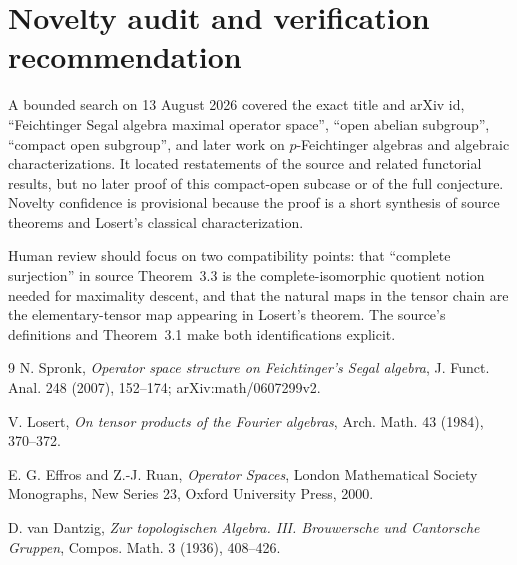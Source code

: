 \documentclass[11pt]{article}
\begin{document}
\section{Novelty audit and verification recommendation}

A bounded search on 13 August 2026 covered the exact title and arXiv id,
``Feichtinger Segal algebra maximal operator space'', ``open abelian
subgroup'', ``compact open subgroup'', and later work on $p$-Feichtinger
algebras and algebraic characterizations.  It located restatements of the
source and related functorial results, but no later proof of this compact-open
subcase or of the full conjecture.  Novelty confidence is provisional because
the proof is a short synthesis of source theorems and Losert's classical
characterization.

Human review should focus on two compatibility points: that ``complete
surjection'' in source Theorem~3.3 is the complete-isomorphic quotient notion
needed for maximality descent, and that the natural maps in the tensor chain
are the elementary-tensor map appearing in Losert's theorem.  The source's
definitions and Theorem~3.1 make both identifications explicit.

\begin{thebibliography}{9}
N. Spronk,
\emph{Operator space structure on Feichtinger's Segal algebra},
J. Funct. Anal. 248 (2007), 152--174; arXiv:math/0607299v2.

V. Losert,
\emph{On tensor products of the Fourier algebras},
Arch. Math. 43 (1984), 370--372.

E. G. Effros and Z.-J. Ruan,
\emph{Operator Spaces},
London Mathematical Society Monographs, New Series 23,
Oxford University Press, 2000.

D. van Dantzig,
\emph{Zur topologischen Algebra. III. Brouwersche und Cantorsche Gruppen},
Compos. Math. 3 (1936), 408--426.
\end{thebibliography}
\end{document}
